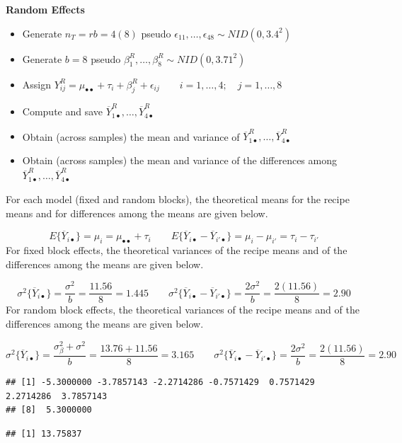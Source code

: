 \documentclass[
]{book}
\providecommand{\tightlist}{%
  \setlength{\itemsep}{0pt}\setlength{\parskip}{0pt}}
\begin{document}
\textbf{Random Effects}

\begin{itemize}
\tightlist
\item
  Generate \(n_T=rb=4(8)\) pseudo
  \(\epsilon_{11}, \ldots , \epsilon_{48} \sim NID\left(0,3.4^2\right)\)
\item
  Generate \(b=8\) pseudo
  \(\beta_1^R,\ldots , \beta_8^R \sim NID\left(0,3.71^2\right)\)
\item
  Assign
  \(Y_{ij}^R=\mu_{\bullet\bullet} + \tau_i + \beta_j^R + \epsilon_{ij} \qquad
   i=1,\ldots,4; \quad j=1,\ldots,8\)
\item
  Compute and save
  \(\overline{Y}_{1\bullet}^R,\ldots,\overline{Y}_{4\bullet}^R\)
\item
  Obtain (across samples) the mean and variance of
  \(\overline{Y}_{1\bullet}^R,\ldots,\overline{Y}_{4\bullet}^R\)
\item
  Obtain (across samples) the mean and variance of the differences among
  \(\overline{Y}_{1\bullet}^R,\ldots,\overline{Y}_{4\bullet}^R\)
\end{itemize}

For each model (fixed and random blocks), the theoretical means for the
recipe means and for differences among the means are given below.

\[
 E\{\overline{Y}_{i\bullet}\}=\mu_i=\mu_{\bullet\bullet}+ \tau_i  \qquad
 E\{\overline{Y}_{i\bullet}-\overline{Y}_{i'\bullet}\}=
 \mu_i-\mu_{i'} = \tau_i - \tau_{i'}  
\] For fixed block effects, the theoretical variances of the recipe
means and of the differences among the means are given below.

\[
 \sigma^2\{\overline{Y}_{i\bullet}\}=\frac{\sigma^2}{b}=\frac{11.56}{8}=1.445  \qquad
 \sigma^2\{\overline{Y}_{i\bullet}-\overline{Y}_{i'\bullet}\}=
 \frac{2\sigma^2}{b}=\frac{2(11.56)}{8}=2.90  
\] For random block effects, the theoretical variances of the recipe
means and of the differences among the means are given below.

\[
 \sigma^2\{\overline{Y}_{i\bullet}\}=\frac{\sigma_{\beta}^2+\sigma^2}{b}=\frac{13.76+11.56}{8}=3.165  \qquad
 \sigma^2\{\overline{Y}_{i\bullet}-\overline{Y}_{i'\bullet}\}=
 \frac{2\sigma^2}{b}=\frac{2(11.56)}{8}=2.90  
\]

\begin{verbatim}
## [1] -5.3000000 -3.7857143 -2.2714286 -0.7571429  0.7571429  2.2714286  3.7857143
## [8]  5.3000000
\end{verbatim}

\begin{verbatim}
## [1] 13.75837
\end{verbatim}
\end{document}

